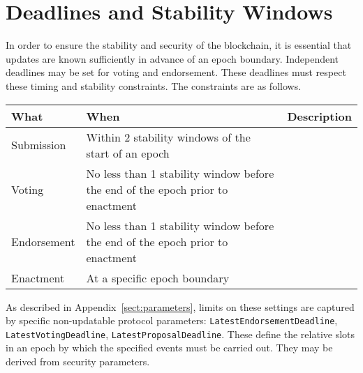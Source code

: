 \section{Deadlines and Stability Windows}
\label{sect:deadlines}

In order to ensure the stability and security of the blockchain, it is essential that updates are known sufficiently in advance of an epoch boundary.
Independent deadlines may be set for voting and endorsement.  These deadlines must respect these timing and stability constraints.
The constraints are as follows.

\begin{tabular}{||l|p{2in}|p{3in}||}
  \hline\hline
  \textbf{What} & \textbf{When} & \textbf{Description} \\
  \hline
  Submission & Within 2 stability windows of the start of an epoch & \\
  \hline
  Voting & No less than 1 stability window before the end of the epoch prior to enactment & \\
  \hline
  Endorsement & No less than 1 stability window before the end of the epoch prior to enactment & \\
  \hline
  Enactment & At a specific epoch boundary & \\
  \hline
\end{tabular}

As described in Appendix~\ref{sect:parameters}, limits on these settings are captured by specific non-updatable protocol parameters:
\texttt{LatestEndorsementDeadline},
\texttt{LatestVotingDeadline},
\texttt{LatestProposalDeadline}.
These define the relative slots in an epoch by which the specified events must be carried out.  They may be derived from security parameters.
